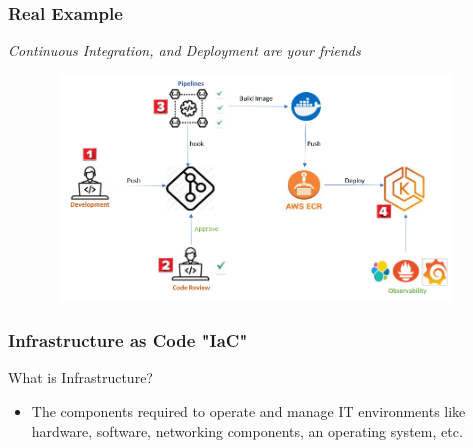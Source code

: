 \documentclass{beamer}
\begin{document}
		\begin{frame}
			\frametitle{Real Example}
			\textit{Continuous Integration, and Deployment are your friends}
			
			\vspace{1mm}
			
			\begin{figure}[h]
				\includegraphics[width=110mm, height=60mm, scale=1]{img/all-in-one.png}
			\end{figure}\vspace{1mm}
			
		\end{frame}
	
	\begin{frame}
		\frametitle{Infrastructure as Code \textbf{"IaC"}}
		What is Infrastructure?
		\begin{itemize}
			\item<2->[] \scriptsize{The components required to operate and manage IT environments like  hardware, software, networking components, an operating system, etc.}
		\end{itemize}
	\vspace{100mm}
	\end{frame}
\end{document}
